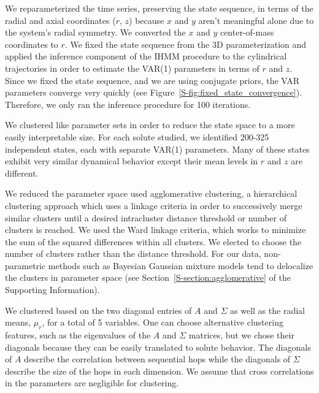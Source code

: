 \documentclass{article}
\begin{document}
  We reparameterized the time series, preserving the state sequence, in terms
  of the radial and axial coordinates ($r$, $z$) because $x$ and $y$ aren't 
  meaningful alone due to the system's radial symmetry. We converted the $x$ and 
  $y$ center-of-mass coordinates to $r$. We fixed the state sequence from the 
  3D parameterization and applied the inference component of the IHMM procedure
  to the cylindrical trajectories in order to estimate the VAR(1) parameters in
  terms of $r$ and $z$. Since we fixed the state sequence, and we are using conjugate
  priors, the VAR parameters converge very quickly (see Figure~\ref{S-fig:fixed_state_convergence}). Therefore, we only ran 
  the inference procedure for 100 iterations. 
  
  We clustered like parameter sets in order to reduce the state space to
  a more easily interpretable size. For each solute studied, we identified 200-325
  independent states, each with separate VAR(1) parameters. Many of these states
  exhibit very similar dynamical behavior except their mean levels in $r$ and $z$
  are different.
  
  We reduced the parameter space used agglomerative clustering, a hierarchical
  clustering approach which uses a linkage criteria in order to successively merge
  similar clusters until a desired intracluster distance threshold or number of
  clusters is reached. We used the Ward linkage criteria, which works to minimize 
  the sum of the squared differences within all clusters.
  We elected to choose the number of clusters rather than the distance threshold.
  For our data, non-parametric methods such as Bayesian Gaussian mixture models tend
  to delocalize the clusters in parameter space (see Section~\ref{S-section:agglomerative}
  of the Supporting Information).
  
  We clustered based on the two diagonal entries of $A$ and $\Sigma$ as well as the
  radial means, $\mu_r$, for a total of 5 variables. One can choose alternative clustering
  features, such as the eigenvalues of the $A$ and $\Sigma$ matrices, but we chose their 
  diagonals because they can be easily translated to solute behavior. The diagonals of $A$
  describe the correlation between sequential hops while the diagonals of $\Sigma$ describe
  the size of the hops in each dimension. We assume that cross correlations in the parameters
  are negligible for clustering.
   
\end{document}

